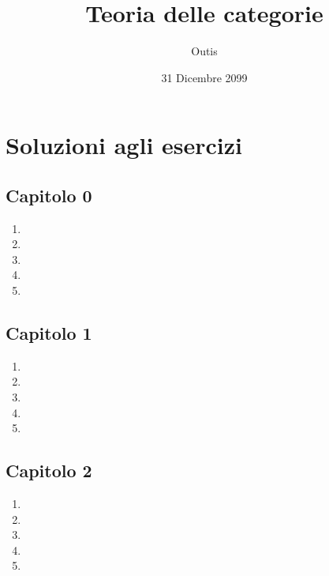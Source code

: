\documentclass[ paper=a4
              , pagesize
              , fontsize=12pt
              , twoside=true
              , BCOR=5mm
              , DIV=calc
              , bibliography=totoc
              , final
              , version=last
              ]{scrbook}
\begin{document}
\frontmatter

\title{Teoria delle categorie}
\author{Outis}
\date{31 Dicembre 2099}
\publishers{Casa editrice}
\uppertitleback{Dettagli pubblicazione I?}
\lowertitleback{Dettagli pubblicazione II?}
\dedication{A Lawvere, per la sua gentilezza}

\maketitle

\tableofcontents

\mainmatter











\appendix

\clearpage

\backmatter
\chapter{Soluzioni agli esercizi}
\section*{Capitolo 0}
\begin{enumerate}
    \item
    \item     
    \item     
    \item     
    \item 
\end{enumerate}
\section*{Capitolo 1}
\begin{enumerate}
    \item
    \item     
    \item     
    \item     
    \item 
\end{enumerate}
\section*{Capitolo 2}
\begin{enumerate}
    \item
    \item     
    \item     
    \item     
    \item 
\end{enumerate}
\end{document}
